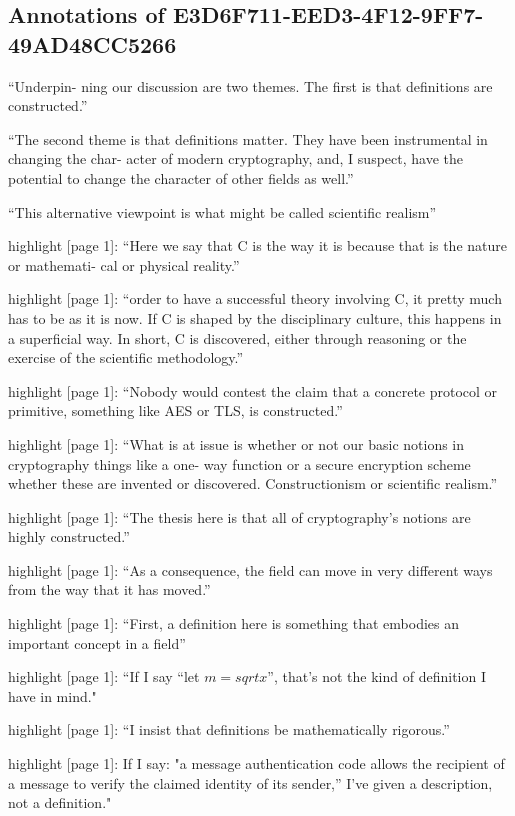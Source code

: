 \subsection{Annotations of E3D6F711-EED3-4F12-9FF7-49AD48CC5266}

``Underpin- ning our discussion are two themes.
The first is that definitions are constructed.''

``The second theme is that definitions matter.
They have been instrumental in changing the char- acter of modern
cryptography, and, I suspect, have the potential to change the character
of other fields as well.''

``This alternative viewpoint is what might be called scientific realism''

highlight {[}page 1{]}: ``Here we say that C is the way it is because
that is the nature or mathemati- cal or physical reality.''

highlight {[}page 1{]}: ``order to have a successful theory involving C,
it pretty much has to be as it is now. If C is shaped by the
disciplinary culture, this happens in a superficial way. In short, C is
discovered, either through reasoning or the exercise of the scientific
methodology.''

highlight {[}page 1{]}: ``Nobody would contest the claim that a concrete protocol or primitive, something like AES or TLS, is constructed.''

highlight {[}page 1{]}: ``What is at issue is whether or not our basic
notions in cryptography things like a one- way function or a secure
encryption scheme whether these are invented or discovered.
Constructionism or scientific realism.''

highlight {[}page 1{]}: ``The thesis here is that all of cryptography's
notions are highly constructed.''

highlight {[}page 1{]}: ``As a consequence, the field can move in very different ways from the way that it has moved.''

highlight {[}page 1{]}: ``First, a definition here is something that
embodies an important concept in a field''

highlight {[}page 1{]}: ``If I say ``let $m = sqrt{x}$'', that's not
the kind of definition I have in mind."

highlight {[}page 1{]}: ``I insist that definitions be mathematically
rigorous.''

highlight {[}page 1{]}: 
If I say: 
"a message authentication code allows the recipient of a message to verify the claimed identity of its sender,'' 
I've given a description, not a definition."

